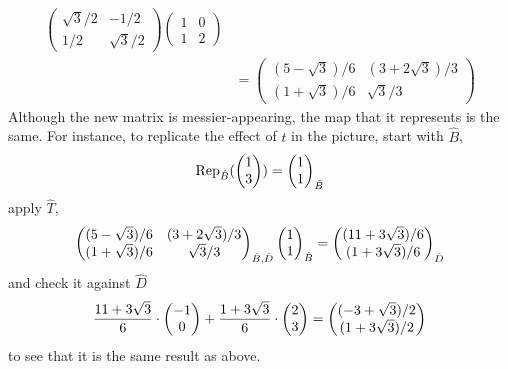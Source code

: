 \begin{example}
\begin{align*}
\begin{pmatrix}
     \sqrt{3}/2  &-1/2  \\
     1/2         &\sqrt{3}/2
  \end{pmatrix}
  \begin{pmatrix}
     1      &0   \\
     1      &2
  \end{pmatrix}                              \\                            
  &=\begin{pmatrix}
     (5-\sqrt{3})/6   &(3+2\sqrt{3})/3 \\
     (1+\sqrt{3})/6  &\sqrt{3}/3
  \end{pmatrix}
\end{align*}
Although the new matrix is messier-appearing,
the map that it represents is the same. 
For instance, to replicate the effect of $t$ in the picture, 
start with $\hat{B}$,
\begin{equation*}
  \rep{\colvec{1 \\ 3}}{\hat{B}}=\colvec{1 \\ 1}_{\hat{B}}
\end{equation*}
apply $\hat{T}$,
\begin{equation*}
  \begin{pmatrix}
     (5-\sqrt{3})/6   &(3+2\sqrt{3})/3 \\
     (1+\sqrt{3})/6  &\sqrt{3}/3
  \end{pmatrix}_{\hat{B},\hat{D}}
  \colvec{1 \\ 1}_{\hat{B}}
  =
  \colvec{(11+3\sqrt{3})/6 \\ (1+3\sqrt{3})/6}_{\hat{D}}
\end{equation*}
and check it against $\hat{D}$
\begin{equation*}
  \frac{11+3\sqrt{3}}{6}\cdot\colvec{-1 \\ 0}
  +\frac{1+3\sqrt{3}}{6}\cdot\colvec{2 \\ 3}
  =\colvec{(-3+\sqrt{3})/2 \\ (1+3\sqrt{3})/2}
\end{equation*}
to see that it is the same result as above.
\end{example}


